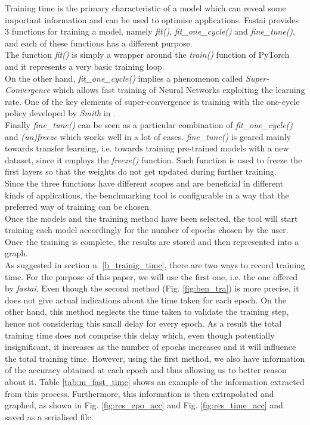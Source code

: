 Training time is the primary characteristic of a model which can reveal some important information and can be used to optimise applications. 
Fastai provides 3 functions for training a model, namely \textit{fit()}, \textit{fit\_one\_cycle()} and \textit{fine\_tune()}, and each of these functions has a different purpose.\\
The function \textit{fit()} is simply a wrapper around the \textit{train()} function of PyTorch and it represents a very basic training loop. \cite{fastaidocs} \\
On the other hand, \textit{fit\_one\_cycle()} implies a phenomenon called \textit{Super-Convergence} which allows fast training of Neural Networks exploiting the learning rate. \cite{DBLP:journals/corr/abs-1708-07120}
One of the key elements of super-convergence is training with the one-cycle policy developed by \textit{Smith} in \cite{DBLP:journals/corr/abs-1803-09820}. \cite{DBLP:journals/corr/abs-1708-07120}\\
Finally \textit{fine\_tune()} can be seen as a particular combination of \textit{fit\_one\_cycle()} and \textit{(un)freeze} which works well in a lot of cases. \textit{fine\_tune()} is geared mainly towards transfer learning, i.e. towards training pre-trained models with a new dataset, since it employs the \textit{freeze()} function. Such function is used to freeze the first layers so that the weights do not get updated during further training.\cite{fastaidocs}\\
Since the three functions have different scopes and are beneficial in different kinds of applications, the benchmarking tool is configurable in a way that the preferred way of training can be chosen. \\
Once the models and the training method have been selected, the tool will start training each model accordingly for the number of epochs chosen by the user. Once the training is complete, the results are stored and then represented into a graph. \\
As suggested in section n. \ref{b_trainig_time}, there are two ways to record training time. For the purpose of this paper, we will use the first one, i.e. the one offered by \textit{fastai}. Even though the second method (Fig. \ref{fig:ben_tra}) is more precise, it does not give actual indications about the time taken for each epoch. On the other hand, this method neglects the time taken to validate the training step, hence not considering this small delay for every epoch. As a result the total training time does not comprise this delay which, even though potentially insignificant, it increases as the number of epochs increases and it will influence the total training time. However, using the first method, we also have information of the accuracy obtained at each epoch
and thus allowing us to better reason about it. Table \ref{tab:m_fast_time} shows an example of the information extracted from this process. Furthermore, this information is then extrapolated and graphed, as shown in Fig. \ref{fig:res_epo_acc} and Fig. \ref{fig:res_time_acc} and saved as a serialised file. 




